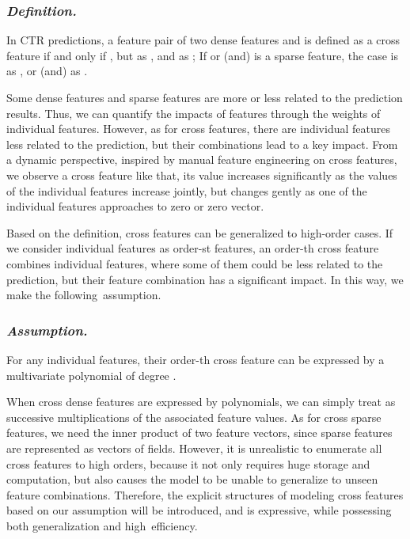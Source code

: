 \documentclass[letterpaper]{article} \usepackage{aaai21}  \usepackage{times}  \usepackage{helvet} \usepackage{courier}  \usepackage[hyphens]{url}  \usepackage{graphicx} \urlstyle{rm} \def\UrlFont{\rm}  \usepackage{natbib}  \usepackage{caption} \frenchspacing  \setlength{\pdfpagewidth}{8.5in}  \setlength{\pdfpageheight}{11in}  \usepackage{graphicx}
\begin{document}
\subsubsection{{\em Definition. }}

In CTR predictions, a feature pair  of two dense features  and  is defined as a cross feature if and only if , but  as , and  as ; If  or (and)  is a sparse feature, the case is  as , or (and)  as .  


Some dense features and sparse features are more or less related to the prediction results. Thus, we can quantify the impacts of features through the weights of individual features. However, as for cross features, there are individual features less related to the prediction, but their combinations lead to a key impact. From a dynamic perspective, inspired by manual feature engineering on cross features, we observe a cross feature like that, its value increases significantly as the values of the individual features increase jointly, but changes gently as one of the individual features approaches to zero or zero vector. 

Based on the definition, cross features can be generalized to high-order cases. If we consider individual features as order-st features, an order-th cross feature combines  individual features, where some of them could be less related to the prediction, but their feature combination has a significant impact. In this way, we make the following~assumption.

\vspace{-0.2cm}
\subsubsection{{\em Assumption. }}

For any individual features, their order-th cross feature can be expressed by a multivariate polynomial of degree .

When cross dense features are expressed by polynomials, we can simply treat as successive multiplications of the associated feature values. As for cross sparse features, we need the inner product of two feature vectors, since sparse features are represented as vectors of fields.
However, it is unrealistic to enumerate all cross features to high orders, because it not only requires huge storage and computation, but also causes the model to be unable to generalize to unseen feature combinations. 
Therefore, the explicit structures of modeling cross features based on our assumption will be introduced, and is expressive, while possessing both generalization and high~efficiency.
\end{document}
